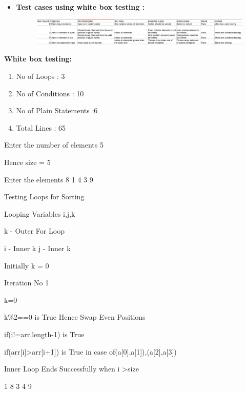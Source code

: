 \documentclass[a4paper,12pt]{article}
\begin{document}
\bigskip
\begin{itemize}
\item \textbf{Test cases using white box testing :}
\begin{figure}[h!]
		\centering
		\includegraphics[width=\textwidth]{testcase.png}
	\end{figure}


\bigskip
\bigskip

\end{itemize}
\noindent \textbf{White box testing:}\\[0.5cm]
\begin{enumerate}
  \item No of Loops : 3
  \item No of Conditions : 10
  \item No of Plain Statements :6
  \item Total Lines : 65
\end{enumerate}

Enter the number of elements
5

Hence size = 5

Enter the elements
8 1 4 3 9

\bigskip
\bigskip

Testing Loops for Sorting\par
Looping Variables i,j,k\par
k - Outer For Loop\par
i - Inner k%
j - Inner k%

Initially k = 0\\\par


Iteration No 1\par
k=0\par
k\%2==0 is True Hence Swap Even Positions\par
if(i!=arr.length-1) is True\par
if(arr[i]\textgreater arr[i+1]) is True in case of{(a[0],a[1]),(a[2],a[3])}\par
Inner Loop Ends Successfully when i \textgreater size\par
1 8 3 4 9\\\par
\end{document}
